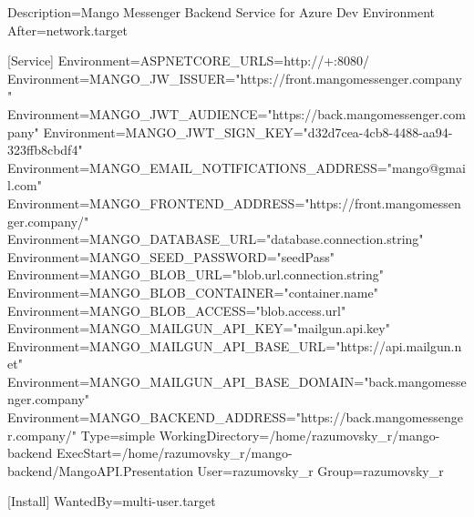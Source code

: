 \begin{spverbatim}
    [Unit]
    Description=Mango Messenger Backend Service for Azure Dev Environment
    After=network.target

    [Service]
    Environment=ASPNETCORE_URLS=http://+:8080/
    Environment=MANGO_JW_ISSUER="https://front.mangomessenger.company"
    Environment=MANGO_JWT_AUDIENCE="https://back.mangomessenger.company"
    Environment=MANGO_JWT_SIGN_KEY="d32d7cea-4cb8-4488-aa94-323ffb8cbdf4"
    Environment=MANGO_EMAIL_NOTIFICATIONS_ADDRESS="mango@gmail.com"
    Environment=MANGO_FRONTEND_ADDRESS="https://front.mangomessenger.company/"
    Environment=MANGO_DATABASE_URL="database.connection.string"
    Environment=MANGO_SEED_PASSWORD="seedPass"
    Environment=MANGO_BLOB_URL="blob.url.connection.string"
    Environment=MANGO_BLOB_CONTAINER="container.name"
    Environment=MANGO_BLOB_ACCESS="blob.access.url"
    Environment=MANGO_MAILGUN_API_KEY="mailgun.api.key"
    Environment=MANGO_MAILGUN_API_BASE_URL="https://api.mailgun.net"
    Environment=MANGO_MAILGUN_API_BASE_DOMAIN="back.mangomessenger.company"
    Environment=MANGO_BACKEND_ADDRESS="https://back.mangomessenger.company/"
    Type=simple
    WorkingDirectory=/home/razumovsky_r/mango-backend
    ExecStart=/home/razumovsky_r/mango-backend/MangoAPI.Presentation
    User=razumovsky_r
    Group=razumovsky_r

    [Install]
    WantedBy=multi-user.target
\end{spverbatim}